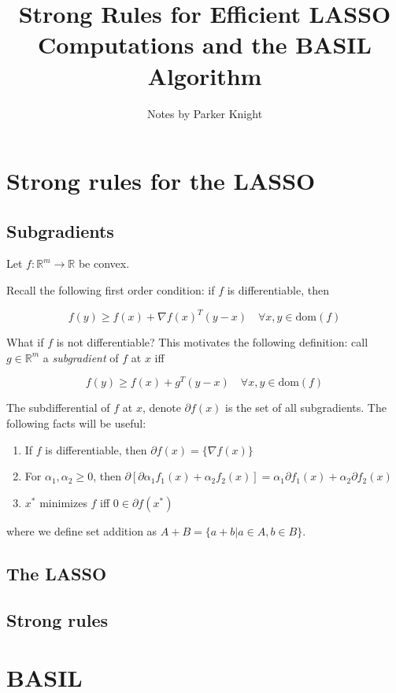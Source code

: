 \documentclass{amsart}
\title{Strong Rules for Efficient LASSO Computations and the BASIL Algorithm}
\author{Notes by Parker Knight}
\newcommand{\R}{\mathbb{R}}
\newcommand{\dom}{\textrm{dom}}
\begin{document}
\maketitle

\section{Strong rules for the LASSO}

\subsection{Subgradients}

Let $f: \R^m \rightarrow \R$ be convex.

\bigskip

Recall the following first order condition: if $f$ is differentiable, then 

$$f(y) \geq f(x) + \nabla f(x)^T(y - x) \quad \forall x, y \in \dom(f)$$

What if $f$ is not differentiable? This motivates the following definition: call
$g \in \R^m$ a \textit{subgradient} of $f$ at $x$ iff

$$f(y) \geq f(x) + g^T(y - x) \quad \forall x, y \in \dom(f)$$

The subdifferential of $f$ at $x$, denote $\partial f(x)$ is the set of all
subgradients. The following facts will be useful:

\begin{enumerate}
	\item If $f$ is differentiable, then $\partial f(x) = \{\nabla f(x) \}$
	\item For $\alpha_1, \alpha_2 \geq 0$, then $\partial \left[\partial
	\alpha_1 f_1(x) + \alpha_2 f_2(x) \right] = \alpha_1 \partial f_1(x) +
	\alpha_2 \partial f_2(x)$
	\item $x^*$ minimizes $f$ iff $0 \in \partial f(x^*)$
\end{enumerate}

where we define set addition as $A + B = \{a + b | a \in A, b \in B \}$. 
\subsection{The LASSO}

\subsection{Strong rules}

\section{BASIL}




\end{document}
